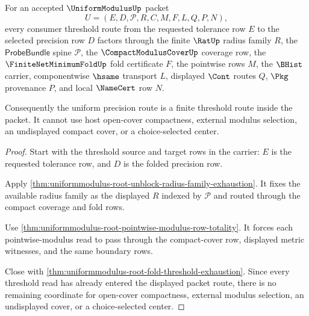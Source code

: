 \begin{theorem}
\label{thm:uniformmodulus-root-unblock-consumer-threshold-route}
For an accepted $\UniformModulusUp$ packet
$$
U=(E,D,\mathcal{P},R,C,M,F,L,Q,P,N),
$$
every consumer threshold route from the requested tolerance row $E$ to the selected precision row $D$ factors through the finite $\RatUp$ radius family $R$, the $\mathsf{ProbeBundle}$ spine $\mathcal{P}$, the $\CompactModulusCoverUp$ coverage row, the $\FiniteNetMinimumFoldUp$ fold certificate $F$, the pointwise rows $M$, the $\BHist$ carrier, componentwise $\hsame$ transport $L$, displayed $\Cont$ routes $Q$, $\Pkg$ provenance $P$, and local $\NameCert$ row $N$.

Consequently the uniform precision route is a finite threshold route inside the packet. It cannot use host open-cover compactness, external modulus selection, an undisplayed compact cover, or a choice-selected center.
\end{theorem}
\begin{proof}
Start with the threshold source and target rows in the carrier: $E$ is the requested tolerance row, and $D$ is the folded precision row.

Apply \autoref{thm:uniformmodulus-root-unblock-radius-family-exhaustion}. It fixes the available radius family as the displayed $R$ indexed by $\mathcal{P}$ and routed through the compact coverage and fold rows.

Use \autoref{thm:uniformmodulus-root-pointwise-modulus-row-totality}. It forces each pointwise-modulus read to pass through the compact-cover row, displayed metric witnesses, and the same boundary rows.

Close with \autoref{thm:uniformmodulus-root-fold-threshold-exhaustion}. Since every threshold read has already entered the displayed packet route, there is no remaining coordinate for open-cover compactness, external modulus selection, an undisplayed cover, or a choice-selected center.
\end{proof}
